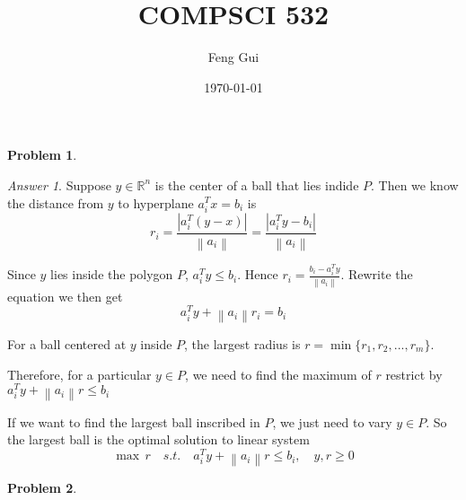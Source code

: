 \documentclass[10pt,a4paper]{article}
\theoremstyle{plain}
\theoremstyle{definition}
\newtheorem{problem}{Problem}
\theoremstyle{remark}
\newtheorem*{answer*}{Answer}
\newcommand{\IR}{\mathbb{R}}
\newcommand{\<}{\langle}
\renewcommand{\>}{\rangle}
\newcommand{\norm}[1]{\left\lVert#1\right\rVert}
\newcommand{\subtitle}[1]{%
  \posttitle{%
    \par\end{center}
    \begin{center}\large#1\end{center}
    \vskip0.5em}%
}
\begin{document}
%

\title{COMPSCI 532}
\subtitle{Assignment 1}
\author{Feng Gui}
\date{\today}



\pagestyle{plain}

\makeatletter
\let\runlhead\@author
\let\runrhead\@title
\makeatother

\renewcommand{\headrulewidth}{1.5pt}
\chead{}
\rhead{\runrhead}

\lfoot{}
\cfoot{}


\maketitle



\begin{problem}
\end{problem}

\begin{answer*} \hfill

Suppose $y\in \IR^n$ is the center of a ball that lies indide $P$. Then we know the distance from $y$ to hyperplane $a_i^T x = b_i$ is
\[r_i = \frac{|a_i^T(y-x)|}{\norm{a_i}} = \frac{|a_i^T y-b_i|}{\norm{a_i}}\]

Since $y$ lies inside the polygon $P$, $a_i^Ty \leq b_i$.  Hence $r_i = \frac{b_i-a_i^T y}{\norm{a_i}}$. Rewrite the equation we then get
\[a_i^Ty+\norm{a_i}r_i = b_i\]

For a ball centered at $y$ inside $P$, the largest radius is $r = \min\{r_1,r_2,...,r_m\}$.

Therefore, for a particular $y\in P$, we need to find the maximum of $r$ restrict by $a_i^Ty+\norm{a_i}r \leq b_i$

If we want to find the largest ball inscribed in $P$, we just need to vary $y\in P$. So the largest ball is the optimal solution to linear system
\[\max\, r \quad s.t. \quad a_i^Ty+\norm{a_i}r \leq b_i, \quad y,r \geq 0\]

\end{answer*}


\begin{problem}
\end{problem}
\end{document}

